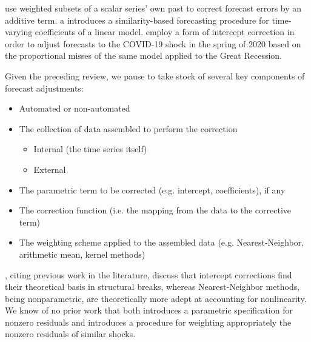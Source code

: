 \documentclass[11pt]{article}
\theoremstyle{definition}
\begin{document}
\citep{guerron2017macroeconomic} use weighted subsets of a scalar series' own past to correct forecast errors by an additive term. \citet{dendramis2020similarity} a introduces a similarity-based forecasting procedure for time-varying coefficients of a linear model. \citet{foroni2022forecasting} employ a form of intercept correction in order to adjust forecasts to the COVID-19 shock in the spring of 2020 based on the proportional misses of the same model applied to the Great Recession.

Given the preceding review, we pause to take stock of several key components of forecast adjustments:

\begin{itemize}
  \item Automated or non-automated
  \item The collection of data assembled to perform the correction
  \begin{itemize}
    \item Internal (the time series itself)
    \item External
  \end{itemize}
  \item The parametric term to be corrected (e.g. intercept, coefficients), if any
  \item The correction function (i.e. the mapping from the data to the corrective term)
  \item The weighting scheme applied to the assembled data (e.g. Nearest-Neighbor, arithmetic mean, kernel methods)
\end{itemize}

\citet{guerron2017macroeconomic}, citing previous work in the literature, discuss that intercept corrections find their theoretical basis in structural breaks, whereas Nearest-Neighbor methods, being nonparametric, are theoretically more adept at accounting for nonlinearity.
We know of no prior work that both introduces a parametric specification for nonzero residuals and introduces a procedure for weighting appropriately the nonzero residuals of similar shocks. 
\end{document}
